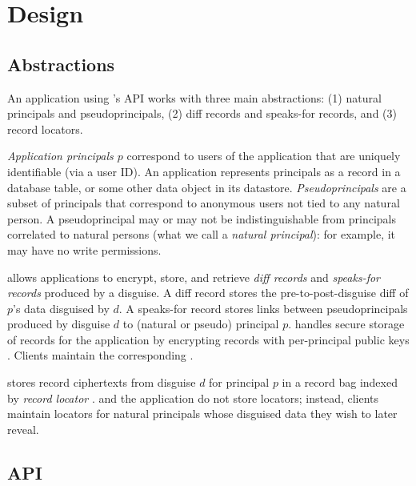 \section{Design}
\label{s:design}

\subsection{Abstractions}
An application using \sys's API works with three main abstractions: (1) natural principals and
pseudoprincipals, (2) diff records and speaks-for records, and (3) record locators.

\emph{Application principals $p$} correspond to users of the application that are uniquely identifiable
(\eg via a user ID). An application represents principals as \eg a record in a  database
table, or some other data object in its datastore.
\emph{Pseudoprincipals} are a subset of principals that correspond to anonymous users not tied to any natural
person. A pseudoprincipal may or may not be indistinguishable from principals correlated to natural
persons (what we call a \emph{natural principal}): for example, it
may have no write permissions.

\sys allows applications to encrypt, store, and retrieve \emph{diff records} and \emph{speaks-for
records} produced by a disguise. A diff record  stores the pre-to-post-disguise diff of
$p$'s data disguised by $d$. A speaks-for record  stores links between pseudoprincipals
produced by disguise $d$ to (natural or pseudo) principal $p$.
\sys handles secure storage of records for the application by encrypting records with per-principal
public keys . Clients maintain the corresponding .

\sys stores record ciphertexts from disguise $d$ for principal $p$ in a record bag indexed by 
\emph{record locator }. \sys and the application do not store locators; instead, 
clients maintain locators for natural principals whose disguised data they wish to later reveal.

\subsection{API}
\label{s:api}



